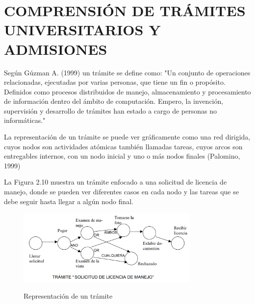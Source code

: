 \documentclass[letter, openright, 12pt]{book}
\newcommand*\setcaptioncitation[1]{\def\captioncitation{\textit{Fuente:}~#1}}
\let\captioncitation\relax
\begin{document}
\section{COMPRENSIÓN DE TRÁMITES UNIVERSITARIOS Y ADMISIONES}

Según Gúzman A. (1999) un trámite se define como: "Un conjunto de operaciones relacionadas, ejecutadas por varias personas, que tiene un fin o propósito. Definidos como procesos distribuidos de manejo, almacenamiento y procesamiento de información dentro del ámbito de computación. Empero, la invención, supervisión y desarrollo de trámites han estado a cargo de personas no informáticas."
\par
La representación de un trámite se puede ver gráficamente como una red dirigida, cuyos nodos son actividades atómicas también llamadas tareas, cuyos arcos son entregables internos, con un nodo inicial y uno o más nodos finales (Palomino, 1999)
\par
La Figura 2.10 muestra un trámite enfocado a una solicitud de licencia de manejo, donde se pueden ver diferentes casos en cada nodo y las tareas que se debe seguir hasta llegar a algún nodo final. 

\begin{figure}[H]
\includegraphics[width=0.8\textwidth]{figura2_10}\\
\setcaptioncitation{(Gúzman, 1999)}
\caption{Representación de un trámite}
\label{tab:figura2_10} 
\end{figure}
\end{document}
